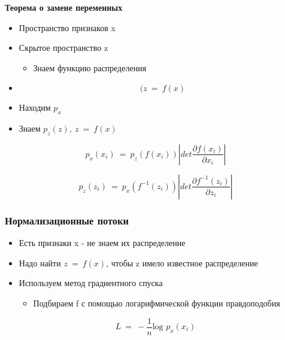\documentclass[a4paper, 12pt]{article}
\begin{document}
\textbf{{Теорема о замене переменных}}

\begin{itemize}
\item
  
  Пространство признаков x
  
\item Скрытое пространство z
  \begin{itemize}
  \item Знаем функцию распределения
  \end{itemize}
\item \[(z\  = \ f(x)\]
  
\item Находим \(p_{x}\)
  
\item Знаем \(p_{z}(z),\ z\  = \ f(x)\)
  
\end{itemize}

\[p_{x}(x_{i})\  = \ p_{z}(f(x_{i}))|det\frac{\partial f(x_{i})}{\partial x_{i}}|\]

\[p_{z}(z_{i})\  = \ p_{x}(f^{- 1}(z_{i}))|det\frac{\partial f^{- 1}(z_{i})}{\partial z_{i}}|\]

\subsubsection{Нормализационные потоки}

\begin{itemize}
\item
  
  Есть признаки x - не знаем их распределение
  
\item
  
  Надо найти \(z\  = \ f(x)\), чтобы z имело известное распределение
  
\item
  
  Используем метод градиентного спуска
  

  \begin{itemize}
  \item
    
    Подбираем f с помощью {{логарифмической функции
    правдоподобия}}
  
  \end{itemize}
\end{itemize}

\[L\  = \  - \frac{1}{n}\text{log\ }p_{x}(x_{i})\]
\end{document}
